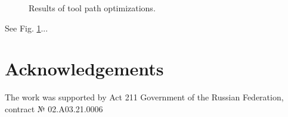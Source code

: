 \documentclass{../download/tPRS2e}
\begin{document}
\begin{figure}
\begin{center}
\caption{Results of tool path optimizations.} \label{nesting-results}
\end{center}
\end{figure}

See Fig. \ref{nesting-results}...

\section*{Acknowledgements}

The work was supported by Act 211 Government of the Russian Federation, contract № 02.A03.21.0006


\nocite{*}

\end{document}
